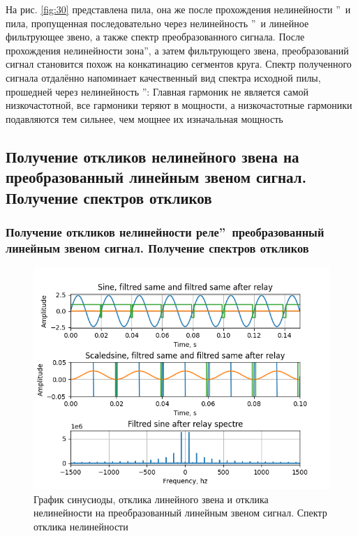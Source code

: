 На рис. \ref{fig:30} представлена пила, она же после прохождения
нелинейности \textquotedblright\ и пила,
пропущенная последовательно через нелинейность
\textquotedblright\ и 
линейное фильтрующее звено, а также спектр преобразованного сигнала.
После прохождения нелинейности  зона\textquotedblright, а
затем фильтрующего звена, преобразований сигнал становится похож на конкатинацию
сегментов круга. Спектр полученного сигнала отдалённо напоминает качественный вид
спектра исходной пилы, прошедней через нелинейность
\textquotedblright: Главная гармоник не является самой
низкочастотной, все гармоники теряют в мощности, а низкочастотные гармоники
подавляются тем сильнее, чем мощнее их изначальная мощность

\subsection{Получение откликов нелинейного звена на преобразованный
линейным звеном сигнал. Получение спектров откликов}

\subsubsection{Получение откликов нелинейности
 реле\textquotedblright\ преобразованный
линейным звеном сигнал. Получение спектров откликов}

\begin{figure}[H]
	\centering
	\includegraphics[width=1.05\linewidth]{body/images/filtred-sine-after-relay-and-its-spectre.png}
	\caption{График синусиоды, отклика линейного звена и отклика нелинейности на преобразованный
	линейным звеном сигнал. Спектр отклика нелинейности}
	\label{fig:31}
\end{figure}

